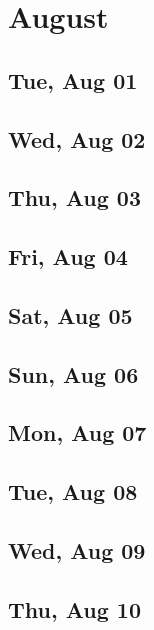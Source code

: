 \chapter{August}
	\section{Tue, Aug 01}
		
	\section{Wed, Aug 02}
		
	\section{Thu, Aug 03}
		
	\section{Fri, Aug 04}
		
	\section{Sat, Aug 05}
		
	\section{Sun, Aug 06}
		
	\section{Mon, Aug 07}
		
	\section{Tue, Aug 08}
		
	\section{Wed, Aug 09}
		
	\section{Thu, Aug 10}
		
